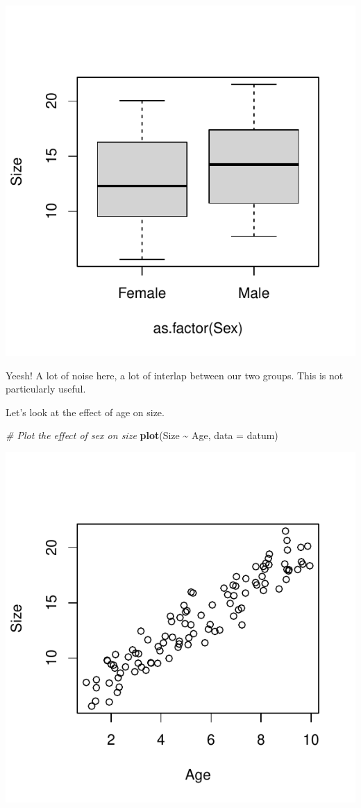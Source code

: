 \documentclass[
]{article}
\newenvironment{Shaded}{\begin{snugshade}}{\end{snugshade}}
\newcommand{\AttributeTok}[1]{\textcolor[rgb]{0.13,0.29,0.53}{#1}}
\newcommand{\CommentTok}[1]{\textcolor[rgb]{0.56,0.35,0.01}{\textit{#1}}}
\newcommand{\FunctionTok}[1]{\textcolor[rgb]{0.13,0.29,0.53}{\textbf{#1}}}
\newcommand{\NormalTok}[1]{#1}
\newcommand{\SpecialCharTok}[1]{\textcolor[rgb]{0.81,0.36,0.00}{\textbf{#1}}}
\begin{document}
\includegraphics{lecture_12_files/figure-latex/analysis_2-1.pdf}

Yeesh! A lot of noise here, a lot of interlap between our two groups.
This is not particularly useful.

Let's look at the effect of age on size.

\begin{Shaded}
\begin{Highlighting}[]
\CommentTok{\# Plot the effect of sex on size}
\FunctionTok{plot}\NormalTok{(Size }\SpecialCharTok{\textasciitilde{}}\NormalTok{ Age, }\AttributeTok{data =}\NormalTok{ datum)}
\end{Highlighting}
\end{Shaded}

\includegraphics{lecture_12_files/figure-latex/analysis_3-1.pdf}
\end{document}
